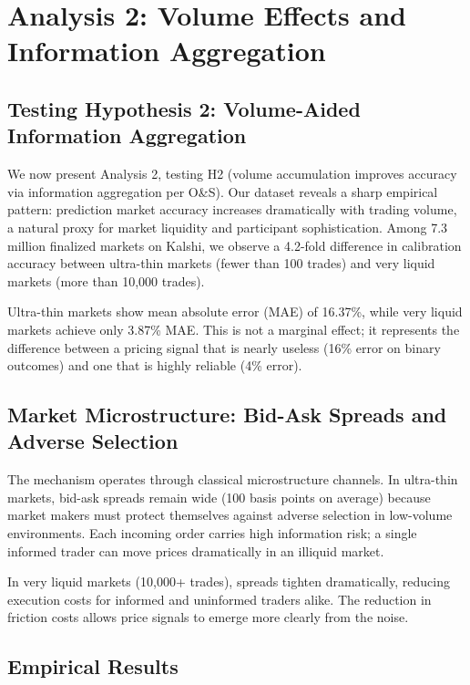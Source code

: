 \documentclass[12pt,letterpaper]{article}
\begin{document}
\clearpage
\section{Analysis 2: Volume Effects and Information Aggregation}\label{sec:analysis2}

\subsection{Testing Hypothesis 2: Volume-Aided Information Aggregation}

We now present Analysis 2, testing H2 (volume accumulation improves accuracy via information aggregation per O\&S). Our dataset reveals a sharp empirical pattern: prediction market accuracy increases dramatically with trading volume, a natural proxy for market liquidity and participant sophistication. Among 7.3 million finalized markets on Kalshi, we observe a 4.2-fold difference in calibration accuracy between ultra-thin markets (fewer than 100 trades) and very liquid markets (more than 10,000 trades).

Ultra-thin markets show mean absolute error (MAE) of 16.37\%, while very liquid markets achieve only 3.87\% MAE. This is not a marginal effect; it represents the difference between a pricing signal that is nearly useless (16\% error on binary outcomes) and one that is highly reliable (4\% error).

\subsection{Market Microstructure: Bid-Ask Spreads and Adverse Selection}

The mechanism operates through classical microstructure channels. In ultra-thin markets, bid-ask spreads remain wide (100 basis points on average) because market makers must protect themselves against adverse selection in low-volume environments. Each incoming order carries high information risk; a single informed trader can move prices dramatically in an illiquid market.

In very liquid markets (10,000+ trades), spreads tighten dramatically, reducing execution costs for informed and uninformed traders alike. The reduction in friction costs allows price signals to emerge more clearly from the noise.

\subsection{Empirical Results}
\end{document}
